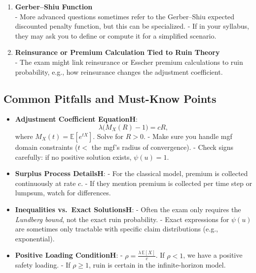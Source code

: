 \documentclass[13pt,a4paper]{article}
\begin{document}
\begin{enumerate}
  \item \textbf{Gerber--Shiu Function}\\
    - More advanced questions sometimes refer to the Gerber--Shiu expected discounted penalty function, but this can be specialized.  
    - If in your syllabus, they may ask you to define or compute it for a simplified scenario.

  \item \textbf{Reinsurance or Premium Calculation Tied to Ruin Theory}\\
    - The exam might link reinsurance or Esscher premium calculations to ruin probability, e.g., how reinsurance changes the adjustment coefficient.

\end{enumerate}

\subsection{Common Pitfalls and Must-Know Points}
\begin{itemize}
  \item \textbf{Adjustment Coefficient EquationH}: 
    \[
      \lambda \bigl(M_X(R)-1\bigr) = cR,
    \]
    where \(M_X(t)=\mathbb{E}[e^{tX}]\). Solve for \(R>0\).
    - Make sure you handle mgf domain constraints (\(t < \) the mgf’s radius of convergence).
    - Check signs carefully: if no positive solution exists, \(\psi(u)=1\).
  \item \textbf{Surplus Process DetailsH}: 
    - For the classical model, premium is collected continuously at rate \(c\).  
    - If they mention premium is collected per time step or lumpsum, watch for differences.
  \item \textbf{Inequalities vs.\ Exact SolutionsH}:
    - Often the exam only requires the \emph{Lundberg bound}, not the exact ruin probability.  
    - Exact expressions for \(\psi(u)\) are sometimes only tractable with specific claim distributions (e.g., exponential).
  \item \textbf{Positive Loading ConditionH}: 
    - \(\rho = \frac{\lambda\,\mathbb{E}[X]}{c}\). If \(\rho<1\), we have a positive safety loading.  
    - If \(\rho \ge 1\), ruin is certain in the infinite-horizon model.
\end{itemize}
\end{document}
